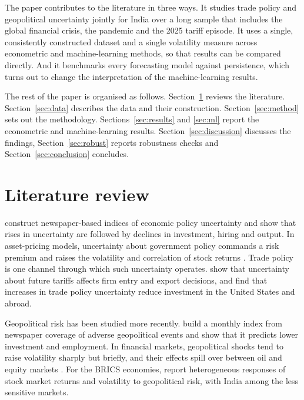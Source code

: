 \documentclass[10pt,twocolumn,a4paper]{article}
\begin{document}
The paper contributes to the literature in three ways. It studies trade policy and geopolitical uncertainty jointly for India over a long sample that includes the global financial crisis, the pandemic and the 2025 tariff episode. It uses a single, consistently constructed dataset and a single volatility measure across econometric and machine-learning methods, so that results can be compared directly. And it benchmarks every forecasting model against persistence, which turns out to change the interpretation of the machine-learning results.

The rest of the paper is organised as follows. Section~\ref{sec:lit} reviews the literature. Section~\ref{sec:data} describes the data and their construction. Section~\ref{sec:method} sets out the methodology. Sections~\ref{sec:results} and \ref{sec:ml} report the econometric and machine-learning results. Section~\ref{sec:discussion} discusses the findings, Section~\ref{sec:robust} reports robustness checks and Section~\ref{sec:conclusion} concludes.

\section{Literature review}\label{sec:lit}

\citet{baker2016} construct newspaper-based indices of economic policy uncertainty and show that rises in uncertainty are followed by declines in investment, hiring and output. In asset-pricing models, uncertainty about government policy commands a risk premium and raises the volatility and correlation of stock returns \citep{pastor2012,pastor2013}. Trade policy is one channel through which such uncertainty operates. \citet{handley2017} show that uncertainty about future tariffs affects firm entry and export decisions, and \citet{caldara2020} find that increases in trade policy uncertainty reduce investment in the United States and abroad.

Geopolitical risk has been studied more recently. \citet{caldara2022} build a monthly index from newspaper coverage of adverse geopolitical events and show that it predicts lower investment and employment. In financial markets, geopolitical shocks tend to raise volatility sharply but briefly, and their effects spill over between oil and equity markets \citep{antonakakis2017,smales2021}. For the BRICS economies, \citet{balcilar2018} report heterogeneous responses of stock market returns and volatility to geopolitical risk, with India among the less sensitive markets.
\end{document}

